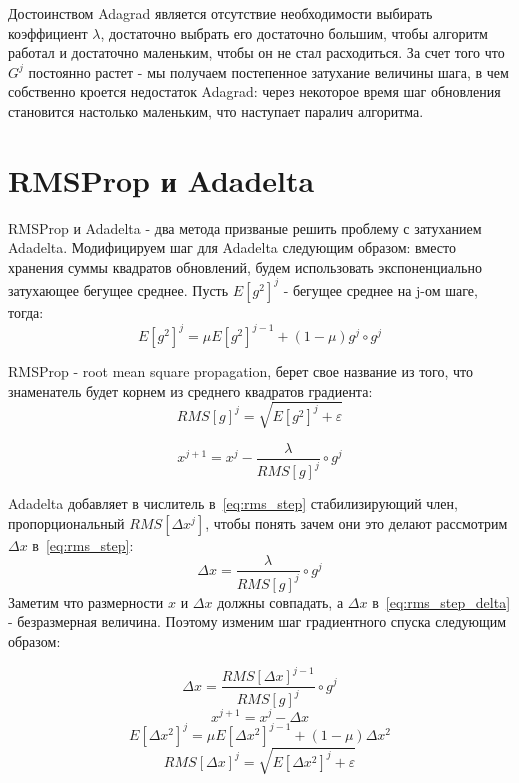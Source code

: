 \documentclass[12pt]{report}
\begin{document}
    Достоинством Adagrad является отсутствие необходимости выбирать коэффициент
    $\lambda$, достаточно выбрать его достаточно большим, чтобы алгоритм работал
    и достаточно маленьким, чтобы он не стал расходиться. За счет того что $G^j$
    постоянно растет - мы получаем постепенное затухание величины шага, в чем
    собственно кроется недостаток Adagrad: через некоторое время шаг обновления
    становится настолько маленьким, что наступает паралич алгоритма.

  \section{RMSProp и Adadelta}
    RMSProp и Adadelta - два метода призваные решить проблему с затуханием
    Adadelta. Модифицируем шаг для Adadelta следующим образом: вместо хранения
    суммы квадратов обновлений, будем использовать экспоненциально затухающее
    бегущее среднее. Пусть $E[g^2]^j$ - бегущее среднее на j-ом шаге, тогда:
    \begin{equation}
      E[g^2]^j=\mu E[g^2]^{j-1} + (1 - \mu)g^j \circ g^j
    \end{equation}

    RMSProp - root mean square propagation, берет свое название из того, что
    знаменатель будет корнем из среднего квадратов градиента:
    \begin{equation}
      RMS[g]^j = \sqrt{E[g^2]^j + \varepsilon}
    \end{equation}

    \begin{equation} \label{eq:rms_step}
      x^{j+1} = x^j - \frac{\lambda}{RMS[g]^j} \circ g^j
    \end{equation}

    Adadelta добавляет в числитель в~\ref{eq:rms_step} стабилизирующий член,
    пропорциональный $RMS[\Delta x^j]$, чтобы понять зачем они это делают
    рассмотрим $\Delta x$ в~\ref{eq:rms_step}:
    \begin{equation} \label{eq:rms_step_delta}
      \Delta x = \frac{\lambda}{RMS[g]^j} \circ g^j
    \end{equation}
    Заметим что размерности $x$ и $\Delta x$ должны совпадать, а $\Delta x$
    в~\ref{eq:rms_step_delta} - безразмерная величина. Поэтому изменим шаг градиентного
    спуска следующим образом:

    \begin{equation}
      \Delta x = \frac{RMS[\Delta x]^{j-1}}{RMS[g]^j} \circ g^j
    \end{equation}
    \begin{equation}
      x^{j+1} = x^j - \Delta x
    \end{equation}
    \begin{equation}
      E[\Delta x^2]^j = \mu E[\Delta x^2]^{j-1} + (1 - \mu)\Delta x^2
    \end{equation}
    \begin{equation}
      RMS[\Delta x]^j = \sqrt{E[\Delta x^2]^j + \varepsilon }
    \end{equation}
\end{document}
